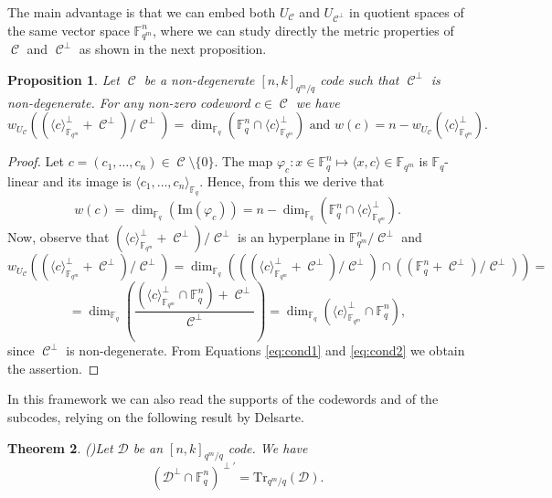 \documentclass[11pt]{amsart}
\DeclareMathOperator{\C}{\mathcal{C}}
\newtheorem{theorem}{Theorem}[section]
\newtheorem{proposition}[theorem]{Proposition}
\newcommand{\fqm}{\mathbb{F}_{q^m}}
\newcommand{\F}{{\mathbb F}}
\newcommand{\fq}{{\mathbb F}_{q}}
\begin{document}
The main advantage is that we can embed both $U_{\C}$ and $U_{\C^\perp}$ in quotient spaces of the same vector space $\F_{q^m}^n$, where we can study directly the metric properties of $\C$ and $\C^\perp$ as shown in the next proposition.

\begin{proposition}
     Let $\C$ be a non-degenerate $[n,k]_{q^m/q}$ code such that $\C^{\perp}$ is non-degenerate.
     For any non-zero codeword $c \in \C$ we have
     \[ w_{U_{\C}}((\langle c\rangle_{\fqm}^\perp+\C^\perp)/\C^\perp )=\dim_{\fq}(\fq^n\cap \langle c \rangle_{\F_{q^m}}^\perp)\,\,\text{and}\,\, w(c)=n-w_{U_{\C}}(\langle c\rangle_{\fqm}^\perp). \]
\end{proposition}
\begin{proof}
    Let $c=(c_1,\ldots,c_n) \in \C\setminus \{0\}$.
    The map $\varphi_{c}\colon x \in \fq^n\mapsto \langle x,c\rangle \in \fqm$ is $\fq$-linear and its image is $\langle c_1,\ldots,c_n\rangle_{\fq}$.
    Hence, from this we derive that 
    \begin{equation}\label{eq:cond1}
    w(c)=\dim_{\fq}(\textrm{Im}(\varphi_c))=n-\dim_{\fq}(\fq^n\cap \langle c \rangle_{\F_{q^m}}^\perp).
    \end{equation}
    Now, observe that $(\langle c\rangle_{\fqm}^\perp+\C^\perp)/\C^\perp$ is an hyperplane in $\fqm^n/\C^\perp$ and
    \begin{equation} \label{eq:cond2} 
    w_{U_{\C}}\left( (\langle c\rangle_{\fqm}^\perp+\C^\perp)/\C^\perp\right)=\dim_{\F_q}\left( ((\langle c\rangle_{\fqm}^\perp+\C^\perp)/\C^\perp) \cap ((\fq^n+\C^\perp)/\C^{\perp})\right)=
    \end{equation}
\[=\dim_{\fq}\left( \frac{(\langle c\rangle_{\fqm}^\perp \cap \fq^n)+\C^\perp}{\C^\perp} \right)=\dim_{\fq}(\langle c\rangle_{\fqm}^\perp \cap \fq^n), \]
since $\C^\perp$ is non-degenerate. From Equations \eqref{eq:cond1} and \eqref{eq:cond2} we obtain the assertion. 
\end{proof}

In this framework we can also read the supports of the codewords and of the subcodes, relying on the following result by Delsarte.

\begin{theorem}(\cite[Theorem 2]{delsarte1975subfield})\label{thm:Delsartetrace}
    Let $\mathcal{D}$ be an $[n,k]_{q^m/q}$ code. We have
    \[ (\mathcal{D}^\perp\cap \fq^n)^{\perp'}=\mathrm{Tr}_{q^m/q}(\mathcal{D}). \]
\end{theorem}
\end{document}
